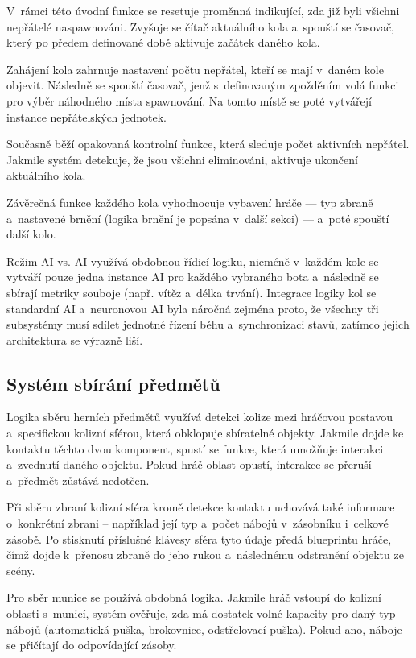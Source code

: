 V~rámci této úvodní funkce se resetuje proměnná indikující, zda již byli všichni nepřátelé naspawnováni. Zvyšuje se čítač aktuálního kola a~spouští se časovač, který po předem definované době aktivuje začátek daného kola.

Zahájení kola zahrnuje nastavení počtu nepřátel, kteří se mají v~daném kole objevit. Následně se spouští časovač, jenž s~definovaným zpožděním volá funkci pro výběr náhodného místa spawnování. Na tomto místě se poté vytvářejí instance nepřátelských jednotek.

Současně běží opakovaná kontrolní funkce, která sleduje počet aktivních nepřátel. Jakmile systém detekuje, že jsou všichni eliminováni, aktivuje ukončení aktuálního kola.

Závěrečná funkce každého kola vyhodnocuje vybavení hráče — typ zbraně a~nastavené brnění (logika brnění je popsána v~další sekci) — a~poté spouští další kolo.

Režim AI vs. AI využívá obdobnou řídicí logiku, nicméně v~každém kole se vytváří pouze jedna instance AI pro každého vybraného bota a~následně se sbírají metriky souboje (např. vítěz a~délka trvání). Integrace logiky kol se standardní AI a~neuronovou AI byla náročná zejména proto, že všechny tři subsystémy musí sdílet jednotné řízení běhu a~synchronizaci stavů, zatímco jejich architektura se výrazně liší.

\subsection{Systém sbírání předmětů}
Logika sběru herních předmětů využívá detekci kolize mezi hráčovou postavou a~specifickou kolizní sférou, která obklopuje sbíratelné objekty. Jakmile dojde ke kontaktu těchto dvou komponent, spustí se funkce, která umožňuje interakci a~zvednutí daného objektu. Pokud hráč oblast opustí, interakce se přeruší a~předmět zůstává nedotčen.

Při sběru zbraní kolizní sféra kromě detekce kontaktu uchovává také informace o~konkrétní zbrani – například její typ a~počet nábojů v~zásobníku i~celkové zásobě. Po stisknutí příslušné klávesy sféra tyto údaje předá blueprintu hráče, čímž dojde k~přenosu zbraně do jeho rukou a~následnému odstranění objektu ze scény.

Pro sběr munice se používá obdobná logika. Jakmile hráč vstoupí do kolizní oblasti s~municí, systém ověřuje, zda má dostatek volné kapacity pro daný typ nábojů (automatická puška, brokovnice, odstřelovací puška). Pokud ano, náboje se přičítají do odpovídající zásoby.

